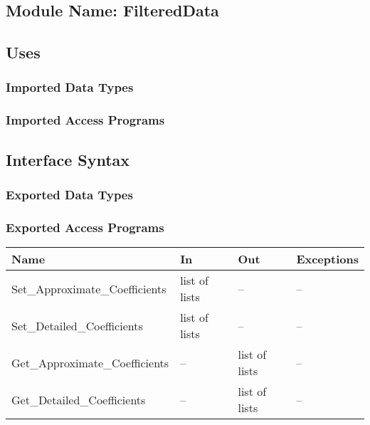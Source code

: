 \documentclass[12pt]{article}
\begin{document}
\subsection{Module Name: FilteredData}
\subsection{Uses}
\subsubsection{Imported Data Types}

\subsubsection{Imported Access Programs}
\subsection{Interface Syntax}
\subsubsection{Exported Data Types}

\subsubsection{Exported Access Programs}
\begin{center}
\begin{tabular}{l l l l}
\hline
\textbf{Name} & \textbf{In} & \textbf{Out} & \textbf{Exceptions} \\ \hline
Set\_Approximate\_Coefficients  & list of lists & -- & --\\
Set\_Detailed\_Coefficients  & list of lists & -- & --\\
Get\_Approximate\_Coefficients  & -- & list of lists & 
-- \\
Get\_Detailed\_Coefficients  & -- & list of lists & 
-- \\
\hline
\end{tabular}
\end{center}
\end{document}
